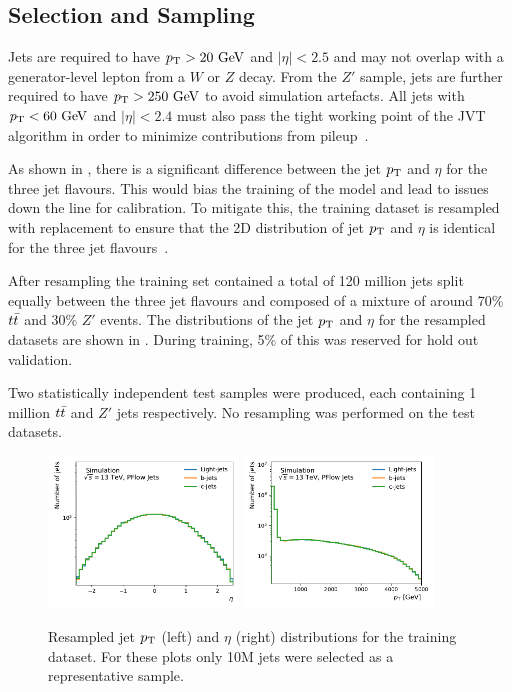 \subsection{Selection and Sampling}

Jets are required to have $\pt > 20~\GeV$ and $|\eta| < 2.5$ and may not overlap with a generator-level lepton from a $W$ or $Z$ decay.
From the $Z'$ sample, jets are further required to have $\pt > 250~\GeV$ to avoid simulation artefacts.
All jets with $\pt < 60~\GeV$ and $|\eta| < 2.4$ must also pass the tight working point of the JVT algorithm in order to minimize contributions from pileup~\cite{JVT}.

As shown in , there is a significant difference between the jet $p_{\text{T}}$ and $\eta$ for the three jet flavours.
This would bias the training of the model and lead to issues down the line for calibration.
To mitigate this, the training dataset is resampled with replacement to ensure that the 2D distribution of jet $p_{\text{T}}$ and $\eta$ is identical for the three jet flavours~\cite{AlexThesis}.

After resampling the training set contained a total of 120 million jets split equally between the three jet flavours and composed of a mixture of around 70\% $t\bar{t}$ and 30\% $Z'$ events.
The distributions of the jet $p_{\text{T}}$ and $\eta$ for the resampled datasets are shown in .
During training, 5\% of this was reserved for hold out validation.

Two statistically independent test samples were produced, each containing 1 million $t\bar{t}$ and $Z'$ jets respectively.
No resampling was performed on the test datasets.

\begin{figure}
    \centering
    \includegraphics[width=0.45\textwidth]{figures/flavour_tagging/train_0.pdf}
    \includegraphics[width=0.45\textwidth]{figures/flavour_tagging/train_1.pdf}
    \caption{Resampled jet $p_{\text{T}}$ (left) and $\eta$ (right) distributions for the training dataset. For these plots only 10M jets were selected as a representative sample.}
    \label{fig:train_jet_pt_eta}
\end{figure}

